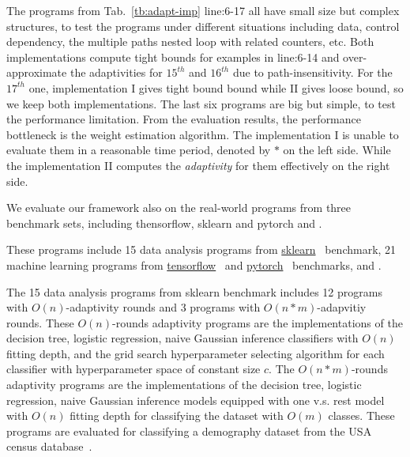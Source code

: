 %
The programs from Tab.~\ref{tb:adapt-imp} line:6-17 all have small size but complex structures, to test the programs under different situations including
data, control dependency,
the multiple paths nested loop with related counters, etc.
Both implementations compute tight bounds for examples in line:6-14
and over-approximate the adaptivities for $15^{th}$ and $16^{th}$ due to path-insensitivity.
For the $17^{th}$ one, implementation I gives tight bound bound while II gives loose bound, so we keep both implementations.
The last six programs are big but simple,
to test the performance limitation. 
From the evaluation results, the performance bottleneck is the weight estimation algorithm.
The implementation I
is unable to evaluate them in a reasonable time period, denoted by $*$ on the left side.
While the implementation II computes the \emph{adaptivity} for
them effectively on the right side. 



We evaluate our framework also on the real-world programs from
three benchmark sets, including thensorflow, sklearn and pytorch and .

These programs include  
15 data analysis programs 
from \hyperlink{https://github.com/scikit-learn/scikit-learn/tree/main/examples}{sklearn}~\cite{SklearnBenchmark} benchmark,
21 machine learning programs
from \hyperlink{https://github.com/tensorflow/tensorflow/tree/master/tensorflow/examples}{tensorflow}~\cite{TensorflowBenchmark} 
and \hyperlink{https://github.com/pytorch/pytorch}{pytorch}~\cite{PytorchBenchmark}
benchmarks,
and .

The 15 data analysis programs 
from sklearn benchmark includes 12 programs with $O(n)$-adaptivity rounds
and 3 programs with $O(n*m)$-adapvitiy rounds.
These $O(n)$-rounds adaptivity programs are
the
implementations of the decision tree, logistic regression, naive Gaussian inference classifiers
with $O(n)$ fitting depth,
and the grid search hyperparameter selecting algorithm for each classifier with 
hyperparameter space of constant size $c$.
The $O(n*m)$-rounds adaptivity programs are
the implementations of the  decision tree, logistic regression, naive Gaussian inference models equipped with one v.s. rest model with $O(n)$ fitting depth for classifying the dataset with $O(m)$ classes.
These programs are evaluated for classifying a demography dataset from 
the USA census database~\cite{CensusDatabase}.


